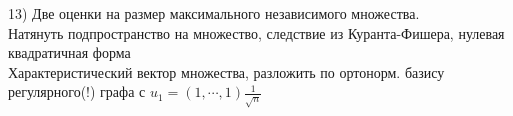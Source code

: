 13) Две оценки на размер максимального независимого множества.\\    
Натянуть подпространство на  множество, следствие из Куранта-Фишера, нулевая квадратичная форма\\
Характеристический вектор множества, разложить по ортонорм. базису регулярного(!) графа с $u_1 = (1,\cdots,1) \frac{1}{\sqrt n}$\\

